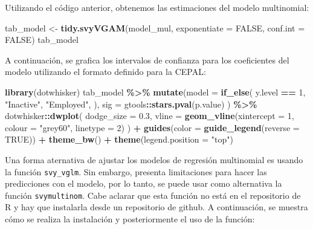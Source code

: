 \documentclass[
  12pt,
]{book}
\newenvironment{Shaded}{\begin{snugshade}}{\end{snugshade}}
\newcommand{\AttributeTok}[1]{\textcolor[rgb]{0.13,0.29,0.53}{#1}}
\newcommand{\ConstantTok}[1]{\textcolor[rgb]{0.56,0.35,0.01}{#1}}
\newcommand{\DecValTok}[1]{\textcolor[rgb]{0.00,0.00,0.81}{#1}}
\newcommand{\FloatTok}[1]{\textcolor[rgb]{0.00,0.00,0.81}{#1}}
\newcommand{\FunctionTok}[1]{\textcolor[rgb]{0.13,0.29,0.53}{\textbf{#1}}}
\newcommand{\NormalTok}[1]{#1}
\newcommand{\OtherTok}[1]{\textcolor[rgb]{0.56,0.35,0.01}{#1}}
\newcommand{\SpecialCharTok}[1]{\textcolor[rgb]{0.81,0.36,0.00}{\textbf{#1}}}
\newcommand{\StringTok}[1]{\textcolor[rgb]{0.31,0.60,0.02}{#1}}
\begin{document}
Utilizando el código anterior, obtenemos las estimaciones del modelo multinomial:

\begin{Shaded}
\begin{Highlighting}[]
\NormalTok{tab\_model }\OtherTok{\textless{}{-}} \FunctionTok{tidy.svyVGAM}\NormalTok{(model\_mul, }
                               \AttributeTok{exponentiate =} \ConstantTok{FALSE}\NormalTok{, }
                               \AttributeTok{conf.int =} \ConstantTok{FALSE}\NormalTok{) }
\NormalTok{tab\_model}
\end{Highlighting}
\end{Shaded}

A continuación, se grafica los intervalos de confianza para los coeficientes del modelo utilizando el formato definido para la CEPAL:

\begin{Shaded}
\begin{Highlighting}[]
\FunctionTok{library}\NormalTok{(dotwhisker)}
\NormalTok{tab\_model }\SpecialCharTok{\%\textgreater{}\%} 
  \FunctionTok{mutate}\NormalTok{(}\AttributeTok{model =} \FunctionTok{if\_else}\NormalTok{(}
\NormalTok{      y.level }\SpecialCharTok{==} \DecValTok{1}\NormalTok{, }
      \StringTok{"Inactive"}\NormalTok{,}
      \StringTok{"Employed"}\NormalTok{, ),}
    \AttributeTok{sig =}\NormalTok{ gtools}\SpecialCharTok{::}\FunctionTok{stars.pval}\NormalTok{(p.value)}
\NormalTok{  )  }\SpecialCharTok{\%\textgreater{}\%} 
\NormalTok{  dotwhisker}\SpecialCharTok{::}\FunctionTok{dwplot}\NormalTok{(}
    \AttributeTok{dodge\_size =} \FloatTok{0.3}\NormalTok{,}
    \AttributeTok{vline =} \FunctionTok{geom\_vline}\NormalTok{(}\AttributeTok{xintercept =} \DecValTok{1}\NormalTok{, }\AttributeTok{colour =} \StringTok{"grey60"}\NormalTok{,}
                       \AttributeTok{linetype =} \DecValTok{2}\NormalTok{)}
\NormalTok{  ) }\SpecialCharTok{+} 
  \FunctionTok{guides}\NormalTok{(}\AttributeTok{color =} \FunctionTok{guide\_legend}\NormalTok{(}\AttributeTok{reverse =} \ConstantTok{TRUE}\NormalTok{)) }\SpecialCharTok{+} 
  \FunctionTok{theme\_bw}\NormalTok{() }\SpecialCharTok{+} \FunctionTok{theme}\NormalTok{(}\AttributeTok{legend.position =} \StringTok{"top"}\NormalTok{)}
\end{Highlighting}
\end{Shaded}

Una forma aternativa de ajustar los modelos de regresión multinomial es usando la función \texttt{svy\_vglm}. Sin embargo, presenta limitaciones para hacer las predicciones con el modelo, por lo tanto, se puede usar como alternativa la función \texttt{svymultinom}. Cabe aclarar que esta función no está en el repositorio de R y hay que instalarla desde un repositorio de github. A continuación, se muestra cómo se realiza la instalación y posteriormente el uso de la función:
\end{document}
